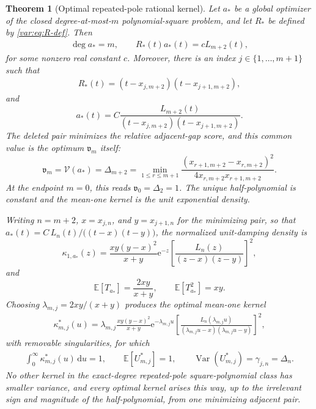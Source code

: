 \documentclass[11pt]{article}
\numberwithin{equation}{section}
\newtheorem{theorem}{Theorem}[section]
\theoremstyle{definition}
\theoremstyle{remark}
\newcommand{\E}{\mathbb E}
\newcommand{\Var}{\operatorname{Var}}
\newcommand{\Vcal}{\mathcal V}
\newcommand{\Lag}{L}
\newcommand{\dd}{\,\mathrm d}
\newcommand{\e}{\mathrm e}
\begin{document}
\begin{theorem}[Optimal repeated-pole rational kernel]\label{adj:thm:final}
Let $a_*$ be a global optimizer of the closed degree-at-most-$m$ polynomial-square problem, and let $R_*$ be defined by \eqref{var:eq:R-def}. Then
\begin{align*}
 \deg a_*=m,
 \qquad
 R_*(t)a_*(t)=c\Lag_{m+2}(t),
\end{align*}
for some nonzero real constant $c$. Moreover, there is an index $j\in\{1,\ldots,m+1\}$ such that
\begin{align*}
 R_*(t)
 =(t-x_{j,m+2})(t-x_{j+1,m+2}),
\end{align*}
and
\begin{equation}\label{adj:eq:final-a}
 a_*(t)
 =C\frac{\Lag_{m+2}(t)}
 {(t-x_{j,m+2})(t-x_{j+1,m+2})}.
\end{equation}
The deleted pair minimizes the relative adjacent-gap score, and this common value is the optimum $\mathfrak v_m$ itself:
\begin{equation}\label{adj:eq:final-value}
\mathfrak v_m
 =\Vcal(a_*)
 =\Delta_{m+2}
 =\min_{1\leq r\leq m+1}
 \frac{(x_{r+1,m+2}-x_{r,m+2})^2}
 {4x_{r,m+2}x_{r+1,m+2}}.
\end{equation}
At the endpoint $m=0$, this reads $\mathfrak v_0=\Delta_2=1$. The unique half-polynomial is constant and the mean-one kernel is the unit exponential density.

Writing $n=m+2$, $x=x_{j,n}$, and $y=x_{j+1,n}$ for the minimizing pair, so that $a_*(t)=C\,\Lag_n(t)/\bigl((t-x)(t-y)\bigr)$, the normalized unit-damping density is
\begin{equation}\label{main:eq:unit-damping-opt}
 \kappa_{1,a_*}(z)
 =\frac{xy(y-x)^2}{x+y}\e^{-z}
 \left[\frac{\Lag_n(z)}{(z-x)(z-y)}\right]^2,
\end{equation}
and
\begin{equation}\label{main:eq:unit-moments}
 \E[T_{a_*}]=\frac{2xy}{x+y},
 \qquad
 \E[T_{a_*}^2]=xy.
\end{equation}
Choosing $\lambda_{m,j}=2xy/(x+y)$ produces the optimal mean-one kernel
\begin{align*}
 \kappa_{m,j}^*(u)
 =\lambda_{m,j}\frac{xy(y-x)^2}{x+y}
 \e^{-\lambda_{m,j}u}
 \left[
 \frac{\Lag_n(\lambda_{m,j}u)}
 {(\lambda_{m,j}u-x)(\lambda_{m,j}u-y)}
 \right]^2,
\end{align*}
with removable singularities, for which
\begin{align*}
 \int_0^\infty\kappa_{m,j}^*(u)\dd u=1,
 \qquad
 \E[U_{m,j}^*]=1,
 \qquad
 \Var(U_{m,j}^*)={\gamma_{j,n}}=\Delta_n.
\end{align*}
No other kernel in the exact-degree repeated-pole square-polynomial class has smaller variance, and every optimal kernel arises this way, up to the irrelevant sign and magnitude of the half-polynomial, from one minimizing adjacent pair.
\end{theorem}
\end{document}
